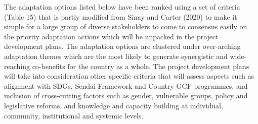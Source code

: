 \documentclass[
]{book}
\begin{document}
The adaptation options listed below have been ranked using a set of criteria (Table 15) that is partly modified from Sinay and Carter (2020) to make it simple for a large group of diverse stakeholders to come to consensus easily on the priority adaptation actions which will be unpacked in the project development plans. The adaptation options are clustered under over-arching adaptation themes which are the most likely to generate synergistic and wide-reaching co-benefits for the country as a whole. The project development plans will take into consideration other specific criteria that will assess aspects such as alignment with SDGs, Sendai Framework and Country GCF programmes, and inclusion of cross-cutting factors such as gender, vulnerable groups, policy and legislative reforms, and knowledge and capacity building at individual, community, institutional and systemic levels.

\providecommand{\docline}[3]{\noalign{\global\setlength{\arrayrulewidth}{#1}}\arrayrulecolor[HTML]{#2}\cline{#3}}

\setlength{\tabcolsep}{2pt}

\renewcommand*{\arraystretch}{1.5}
\end{document}

